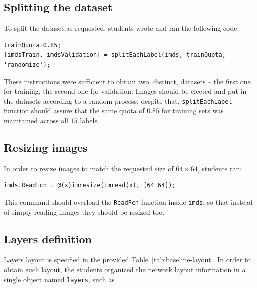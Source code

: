 \documentclass[a4paper, 11pt]{article} %
\begin{document}
\subsection{Splitting the dataset}

To split the dataset as requested, students wrote and ran the following code:

\begin{lstlisting}
trainQuota=0.85;
[imdsTrain, imdsValidation] = splitEachLabel(imds, trainQuota, 'randomize');
\end{lstlisting}

These instructions were sufficient to obtain two, distinct, datasets \--- the first one for training, the second one for validation. Images should be elected and put in the datasets according to a random process; despite that, \texttt{splitEachLabel} function should assure that the same quota of $0.85$ for training sets was maintained across all $15$ labels.

\subsection{Resizing images}

In order to resize images to match the requested size of $64 \times 64$, students ran:

\begin{lstlisting} 
imds.ReadFcn = @(x)imresize(imread(x), [64 64]);
\end{lstlisting}

This command should overload the \texttt{ReadFcn} function inside \texttt{imds}, so that instead of simply reading images they should be resized too.

\subsection{Layers definition}

Layers layout is specified in the provided Table~\ref{tab:baseline-layout}. In order to obtain such layout, the students organized the network layout information in a single object named \texttt{layers}, such as
\end{document}
